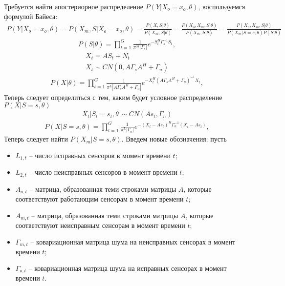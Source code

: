 \documentclass[11pt]{article}
\begin{document}
\begin{center}
\fontsize{16}{20}\selectfont {}
\end{center}
Требуется найти апостериорное распределение $P(Y|X_o=x_o,\theta)$, воспользуемся формулой Байеса:
\begin{gather}
P(Y|X_o=x_o,\theta) = P(X_m, S|X_o=x_o,\theta) = \frac{P(X, S|\theta)}{P(X_m, S|\theta)} = \frac{P(X_o, X_m, S|\theta)}{P(X_m, S|\theta)} = \frac{P(X_o, X_m, S|\theta)}{P(X_m|S=s, \theta)P(S|\theta)} 
\end{gather}
\begin{gather}
P(S|\theta) = \prod_{t=1}^G \frac{1}{\pi^M |\Gamma_s|}e^{-S_t^H\Gamma_s^{-1}S_t},
\end{gather}
\begin{gather*}
X_t = AS_t + N_t \\
X_t \sim CN(0, A\Gamma_s A^H + \Gamma_n)
\end{gather*}
\begin{gather}
P(X|\theta) = \prod_{t=1}^G \frac{1}{\pi^L |A\Gamma_s  A^H + \Gamma_n|}e^{-X_t^H (A\Gamma_s A^H + \Gamma_n)^{-1}X_t},
\end{gather}
Теперь следует определиться с тем, каким будет условное распределение $P(X|S=s, \theta)$
\begin{gather*}
X_t|S_t=s_t, \theta \, \sim CN(A s_t, \Gamma_n)
\end{gather*}
\begin{gather}
P(X|S=s,\theta) = \prod_{t=1}^G \frac{1}{\pi^L |\Gamma_n|}e^{-(X_t-A s_t)^H \Gamma_n^{-1}(X_t-A s_t)},
\end{gather}
Теперь следует найти $P(X_m|S=s, \theta)$. Введем новые обозначения: пусть
\begin{itemize}
\item
$L_{1,t}$ -- число исправных сенсоров в момент времени $t$;
\item
 $L_{2,t}$ -- число неисправных сенсоров в момент времени $t$;
\item 
$A_{o,t}$ -- матрица, образованная теми строками матрицы $A$, которые соответствуют работающим сенсорам в момент времени $t$; 
\item
$A_{m,t}$ -- матрица, образованная теми строками матрицы $A$, которые соответствуют неисправным сенсорам в момент времени $t$;
\item
$\Gamma_{m,t}$ -- ковариационная матрица шума на неисправных сенсорах в момент времени $t$;
\item 
 $\Gamma_{o,t}$ -- ковариационная матрица шума на исправных сенсорах в момент времени $t$.
\end{itemize}
\end{document}
